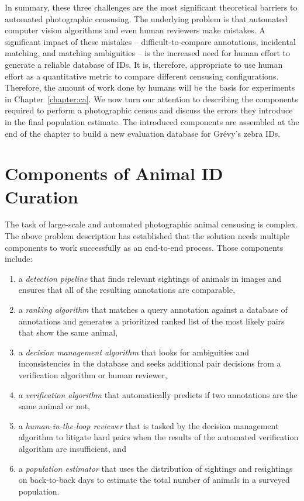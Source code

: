 In summary, these three challenges are the most significant theoretical barriers to automated photographic censusing.  The underlying problem is that automated computer vision algorithms and even human reviewers make mistakes.  A significant impact of these mistakes -- difficult-to-compare annotations, incidental matching, and matching ambiguities -- is the increased need for human effort to generate a reliable database of IDs.  It is, therefore, appropriate to use human effort as a quantitative metric to compare different censusing configurations.  Therefore, the amount of work done by humans will be the basis for experiments in Chapter~\ref{chapter:ca}.
We now turn our attention to describing the components required to perform a photographic census and discuss the errors they introduce in the final population estimate.  The introduced components are assembled at the end of the chapter to build a new evaluation database for Gr\'evy's zebra IDs.

\section{Components of Animal ID Curation}

The task of large-scale and automated photographic animal censusing is complex.  The above problem description has established that the solution needs multiple components to work successfully as an end-to-end process.  Those components include:

\begin{enumerate}
    \item a \textit{detection pipeline} that finds relevant sightings of animals in images and ensures that all of the resulting annotations are comparable,
    \item a \textit{ranking algorithm} that matches a query annotation against a database of annotations and generates a prioritized ranked list of the most likely pairs that show the same animal,
    \item a \textit{decision management algorithm} that looks for ambiguities and inconsistencies in the database and seeks additional pair decisions from a verification algorithm or human reviewer,
    \item a \textit{verification algorithm} that automatically predicts if two annotations are the same animal or not,
    \item a \textit{human-in-the-loop reviewer} that is tasked by the decision management algorithm to litigate hard pairs when the results of the automated verification algorithm are insufficient, and
    \item a \textit{population estimator} that uses the distribution of sightings and resightings on back-to-back days to estimate the total number of animals in a surveyed population.
\end{enumerate}

